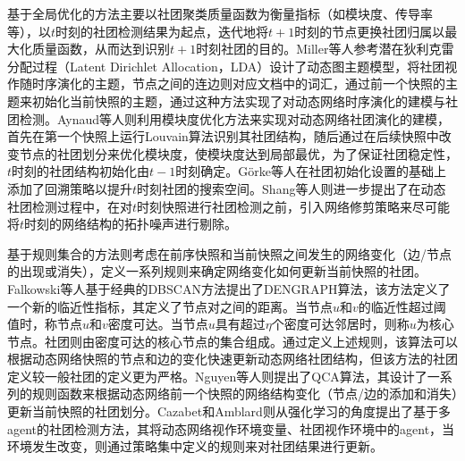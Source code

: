 基于全局优化的方法主要以社团聚类质量函数为衡量指标（如模块度、传导率等），以$t$时刻的社团检测结果为起点，迭代地将$t+1$时刻的节点更换社团归属以最大化质量函数，从而达到识别$t+1$时刻社团的目的。Miller等人\cite{miller2010continuous}参考潜在狄利克雷分配过程（Latent Dirichlet Allocation，LDA）设计了动态图主题模型，将社团视作随时序演化的主题，节点之间的连边则对应文档中的词汇，通过前一个快照的主题来初始化当前快照的主题，通过这种方法实现了对动态网络时序演化的建模与社团检测。Aynaud等人则利用模块度优化方法来实现对动态网络社团演化的建模，首先在第一个快照上运行Louvain算法识别其社团结构，随后通过在后续快照中改变节点的社团划分来优化模块度，使模块度达到局部最优，为了保证社团稳定性，$t$时刻的社团结构初始化由$t-1$时刻确定。G{\"o}rke等人\cite{gorke2010modularity}在社团初始化设置的基础上添加了回溯策略以提升$t$时刻社团的搜索空间。Shang等人\cite{shang2014real}则进一步提出了在动态社团检测过程中，在对$t$时刻快照进行社团检测之前，引入网络修剪策略来尽可能将$t$时刻的网络结构的拓扑噪声进行剔除。  

基于规则集合的方法则考虑在前序快照和当前快照之间发生的网络变化（边/节点的出现或消失），定义一系列规则来确定网络变化如何更新当前快照的社团。Falkowski等人\cite{falkowski2008studying}基于经典的DBSCAN方法提出了DENGRAPH算法，该方法定义了一个新的临近性指标，其定义了节点对之间的距离。当节点$u$和$v$的临近性超过阈值时，称节点$u$和$v$密度可达。当节点$u$具有超过$\eta$个密度可达邻居时，则称$u$为核心节点。社团则由密度可达的核心节点的集合组成。通过定义上述规则，该算法可以根据动态网络快照的节点和边的变化快速更新动态网络社团结构，但该方法的社团定义较一般社团的定义更为严格。Nguyen等人\cite{nguyen2011adaptive}则提出了QCA算法，其设计了一系列的规则函数来根据动态网络前一个快照的网络结构变化（节点/边的添加和消失）更新当前快照的社团划分。Cazabet和Amblard\cite{cazabet2011simulate}则从强化学习的角度提出了基于多agent的社团检测方法，其将动态网络视作环境变量、社团视作环境中的agent，当环境发生改变，则通过策略集中定义的规则来对社团结果进行更新。

